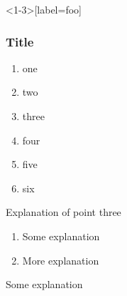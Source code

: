 \documentclass{beamer}
\begin{document}
\begin{frame}<1-3>[label=foo]
\frametitle{Title}
    \begin{enumerate}[<+->] 
        \setlength\itemsep{5pt plus 1fill}
    \item one
    \item two
    \item three
    \item four
    \item five
    \item six
    \end{enumerate}
\end{frame}

\begin{frame}{Explanation of point three}
\begin{enumerate}[<+->] 
        \setlength\itemsep{5pt plus 1fill}
    \item Some explanation
    \item More explanation
    \end{enumerate}
Some explanation
\end{frame}

\end{document}

